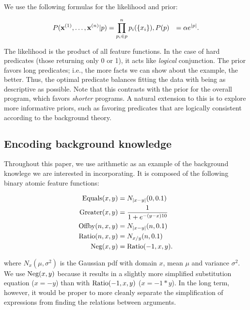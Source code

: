 \documentclass{acmsiggraph}
\begin{document}
We use the following formulas for the likelihood and prior:

\begin{align*}
P({\mathbf{x}^{(1)}}, \ldots, {\mathbf{x}^{(n)}} | p) &= \prod^n_{p_i \in p} p_i(\{x_i\}),
P(p) &= \alpha e^{|p|}.
\end{align*}

The likelihood is the product of all feature functions.
In the case of hard predicates (those returning only 0 or 1), 
it acts like \emph{logical} conjunction.
The prior favors long predicates; i.e., the more facts we can show about the example, the better.
Thus, the optimal predicate balances fitting the data with being as descriptive as possible.
Note that this contrasts with the prior for the overall program,
which favors \emph{shorter} programs.
A natural extension to this is to explore more informative priors,
such as favoring predicates that are logically consistent
according to the background theory.

\subsection{Encoding background knowledge}

Throughout this paper,
we use arithmetic as an example of the background knowlege
we are interested in incorporating.
It is composed of the following binary atomic feature functions:

\newcommand{\Equals}{\textup{Equals}}
\newcommand{\Offby}{\textup{Offby}}
\newcommand{\Greater}{\textup{Greater}}
\newcommand{\Neg}{\textup{Neg}}
\newcommand{\Ratio}{\textup{Ratio}}
\newcommand{\AND}{\wedge}

\newcommand{\Gauss}[3]{N_{#1}(#2, #3)}
\newcommand{\Sigmoid}[3]{\frac{1}{1 + e^{-(#2 - #1) #3}}}

\begin{align*}
\Equals(x, y) &= \Gauss{|x - y|}{0}{0.1} \\
\Greater(x, y) &= \Sigmoid{x}{y}{10} \\
\Offby(n, x, y) &= \Gauss{|x - y|}{n}{0.1} \\
\Ratio(n, x, y) &= \Gauss{x / y}{n}{0.1} \\
\Neg(x, y) &= \Ratio(-1, x, y).
\end{align*}

where $\Gauss{x}{\mu}{\sigma^2}$ is the Gaussian pdf with domain $x$, mean $\mu$ and variance $\sigma^2$.
We use $\Neg(x, y)$ because it results in a slightly more simplified substitution equation ($x = -y$)
than with $\Ratio(-1, x, y)$ ($x = -1 * y$).
In the long term, however,
it would be proper to more cleanly separate
the simplification of expressions
from finding the relations between arguments.
\end{document}
